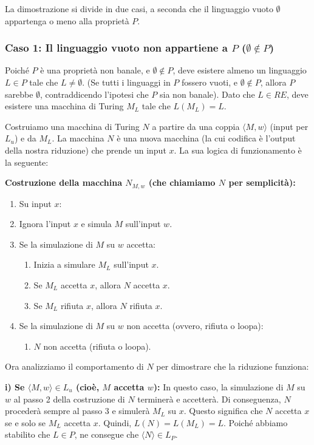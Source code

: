 \documentclass[a4paper]{article}
\theoremstyle{definition} %
\begin{document}
La dimostrazione si divide in due casi, a seconda che il linguaggio vuoto $\emptyset$ appartenga o meno alla proprietà $P$.

\subsubsection{Caso 1: Il linguaggio vuoto non appartiene a $P$ ($\emptyset \notin P$)}
Poiché $P$ è una proprietà non banale, e $\emptyset \notin P$, deve esistere almeno un linguaggio $L \in P$ tale che $L \neq \emptyset$. (Se tutti i linguaggi in $P$ fossero vuoti, e $\emptyset \notin P$, allora $P$ sarebbe $\emptyset$, contraddicendo l'ipotesi che $P$ sia non banale).
Dato che $L \in RE$, deve esistere una macchina di Turing $M_L$ tale che $L(M_L) = L$.

Costruiamo una macchina di Turing $N$ a partire da una coppia $\langle M,w \rangle$ (input per $L_u$) e da $M_L$. La macchina $N$ è una nuova macchina (la cui codifica è l'output della nostra riduzione) che prende un input $x$. La sua logica di funzionamento è la seguente:

\textbf{Costruzione della macchina $N_{M,w}$ (che chiamiamo $N$ per semplicità):}
\begin{enumerate}
    \item Su input $x$:
    \item Ignora l'input $x$ e simula $M$ sull'input $w$.
    \item Se la simulazione di $M$ su $w$ accetta:
        \begin{enumerate}
            \item Inizia a simulare $M_L$ sull'input $x$.
            \item Se $M_L$ accetta $x$, allora $N$ accetta $x$.
            \item Se $M_L$ rifiuta $x$, allora $N$ rifiuta $x$.
        \end{enumerate}
    \item Se la simulazione di $M$ su $w$ non accetta (ovvero, rifiuta o loopa):
        \begin{enumerate}
            \item $N$ non accetta (rifiuta o loopa).
        \end{enumerate}
\end{enumerate}

Ora analizziamo il comportamento di $N$ per dimostrare che la riduzione funziona:

\textbf{i) Se $\langle M,w \rangle \in L_u$ (cioè, $M$ accetta $w$):}
In questo caso, la simulazione di $M$ su $w$ al passo 2 della costruzione di $N$ terminerà e accetterà. Di conseguenza, $N$ procederà sempre al passo 3 e simulerà $M_L$ su $x$. Questo significa che $N$ accetta $x$ se e solo se $M_L$ accetta $x$.
Quindi, $L(N) = L(M_L) = L$.
Poiché abbiamo stabilito che $L \in P$, ne consegue che $\langle N \rangle \in L_P$.
\end{document}
